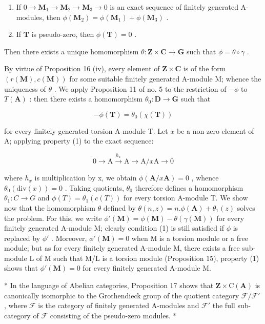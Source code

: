 \begin{enumerate}
\def\labelenumi{(\arabic{enumi})}
\item
  If \(0 \to \mathbf{M}_1 \to \mathbf{M}_2 \to \mathbf{M}_3 \to 0\) is an exact sequence of finitely generated A-modules, then \(\phi(\mathbf{M}_2) = \phi(\mathbf{M}_1) + \phi(\mathbf{M}_3)\) .
\item
  If \(\mathbf{T}\) is pseudo-zero, then \(\phi (\mathbf{T}) = 0\) .
\end{enumerate}

Then there exists a unique homomorphism \(\theta: \mathbf{Z} \times \mathbf{C} \to \mathbf{G}\) such that \(\phi = \theta \circ \gamma\) .

By virtue of Proposition 16 (iv), every element of \(\mathbf{Z} \times \mathbf{C}\) is of the form \((r(\mathbf{M}), c(\mathbf{M}))\) for some suitable finitely generated A-module M; whence the uniqueness of \(\theta\) . We apply Proposition 11 of no. 5 to the restriction of \(-\phi\) to \(T(\mathbf{A})\) : then there exists a homomorphism \(\theta_0: \mathbf{D} \to \mathbf{G}\) such that

\[
- \phi (\mathbf {T}) = \theta_ {0} (\chi (\mathbf {T}))
\]

for every finitely generated torsion A-module T. Let \(x\) be a non-zero element of A; applying property (1) to the exact sequence:

\[
0 \longrightarrow \mathrm{A} \xrightarrow {h _ {x}} \mathrm{A} \longrightarrow \mathrm{A} / x \mathrm{A} \longrightarrow 0
\]

where \(h_{x}\) is multiplication by x, we obtain \(\phi(\mathbf{A}/x\mathbf{A}) = 0\) , whence \(\theta_{0}(\mathrm{div}(x)) = 0\) . Taking quotients, \(\theta_{0}\) therefore defines a homomorphism \(\theta_{1}: C \to G\) and \(\phi(T) = \theta_{1}(c(T))\) for every torsion A-module T. We show now that the homomorphism \(\theta\) defined by \(\theta(n, z) = n.\phi(\mathbf{A}) + \theta_{1}(z)\) solves the problem. For this, we write \(\phi'(\mathbf{M}) = \phi(\mathbf{M}) - \theta(\gamma(\mathbf{M}))\) for every finitely generated A-module M; clearly condition (1) is still satisfied if \(\phi\) is replaced by \(\phi'\) . Moreover, \(\phi'(\mathbf{M}) = 0\) when M is a torsion module or a free module; but as for every finitely generated A-module M, there exists a free sub-module L of M such that M/L is a torsion module (Proposition 15), property (1) shows that \(\phi'(\mathbf{M}) = 0\) for every finitely generated A-module M.

* In the language of Abelian categories, Proposition 17 shows that \(\mathbf{Z} \times \mathrm{C}(\mathbf{A})\) is canonically isomorphic to the Grothendieck group of the quotient category \(\mathcal{F}/\mathcal{F}'\) , where \(\mathcal{F}\) is the category of finitely generated A-modules and \(\mathcal{F}'\) the full sub-category of \(\mathcal{F}\) consisting of the pseudo-zero modules. *

